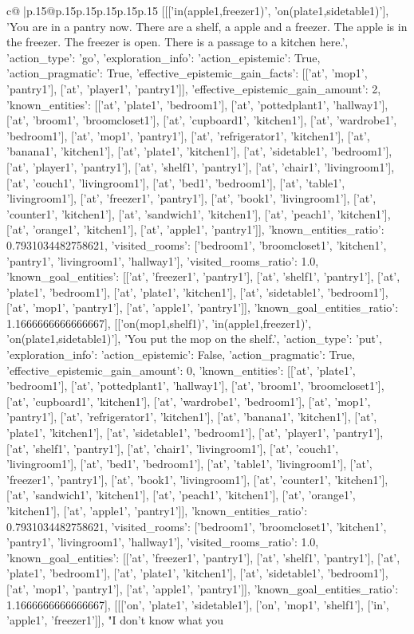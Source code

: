 \documentclass{article}
\begin{document}
{\begin{supertabular}{c@{$\;$}|p{.15\linewidth}@{}p{.15\linewidth}p{.15\linewidth}p{.15\linewidth}p{.15\linewidth}p{.15\linewidth}}
{{{	 [[['in(apple1,freezer1)', 'on(plate1,sidetable1)'], 'You are in a pantry now. There are a shelf, a apple and a freezer. The apple is in the freezer. The freezer is open. There is a passage to a kitchen here.', {'action_type': 'go', 'exploration_info': {'action_epistemic': True, 'action_pragmatic': True, 'effective_epistemic_gain_facts': [['at', 'mop1', 'pantry1'], ['at', 'player1', 'pantry1']], 'effective_epistemic_gain_amount': 2, 'known_entities': [['at', 'plate1', 'bedroom1'], ['at', 'pottedplant1', 'hallway1'], ['at', 'broom1', 'broomcloset1'], ['at', 'cupboard1', 'kitchen1'], ['at', 'wardrobe1', 'bedroom1'], ['at', 'mop1', 'pantry1'], ['at', 'refrigerator1', 'kitchen1'], ['at', 'banana1', 'kitchen1'], ['at', 'plate1', 'kitchen1'], ['at', 'sidetable1', 'bedroom1'], ['at', 'player1', 'pantry1'], ['at', 'shelf1', 'pantry1'], ['at', 'chair1', 'livingroom1'], ['at', 'couch1', 'livingroom1'], ['at', 'bed1', 'bedroom1'], ['at', 'table1', 'livingroom1'], ['at', 'freezer1', 'pantry1'], ['at', 'book1', 'livingroom1'], ['at', 'counter1', 'kitchen1'], ['at', 'sandwich1', 'kitchen1'], ['at', 'peach1', 'kitchen1'], ['at', 'orange1', 'kitchen1'], ['at', 'apple1', 'pantry1']], 'known_entities_ratio': 0.7931034482758621, 'visited_rooms': ['bedroom1', 'broomcloset1', 'kitchen1', 'pantry1', 'livingroom1', 'hallway1'], 'visited_rooms_ratio': 1.0, 'known_goal_entities': [['at', 'freezer1', 'pantry1'], ['at', 'shelf1', 'pantry1'], ['at', 'plate1', 'bedroom1'], ['at', 'plate1', 'kitchen1'], ['at', 'sidetable1', 'bedroom1'], ['at', 'mop1', 'pantry1'], ['at', 'apple1', 'pantry1']], 'known_goal_entities_ratio': 1.1666666666666667}}], [['on(mop1,shelf1)', 'in(apple1,freezer1)', 'on(plate1,sidetable1)'], 'You put the mop on the shelf.', {'action_type': 'put', 'exploration_info': {'action_epistemic': False, 'action_pragmatic': True, 'effective_epistemic_gain_amount': 0, 'known_entities': [['at', 'plate1', 'bedroom1'], ['at', 'pottedplant1', 'hallway1'], ['at', 'broom1', 'broomcloset1'], ['at', 'cupboard1', 'kitchen1'], ['at', 'wardrobe1', 'bedroom1'], ['at', 'mop1', 'pantry1'], ['at', 'refrigerator1', 'kitchen1'], ['at', 'banana1', 'kitchen1'], ['at', 'plate1', 'kitchen1'], ['at', 'sidetable1', 'bedroom1'], ['at', 'player1', 'pantry1'], ['at', 'shelf1', 'pantry1'], ['at', 'chair1', 'livingroom1'], ['at', 'couch1', 'livingroom1'], ['at', 'bed1', 'bedroom1'], ['at', 'table1', 'livingroom1'], ['at', 'freezer1', 'pantry1'], ['at', 'book1', 'livingroom1'], ['at', 'counter1', 'kitchen1'], ['at', 'sandwich1', 'kitchen1'], ['at', 'peach1', 'kitchen1'], ['at', 'orange1', 'kitchen1'], ['at', 'apple1', 'pantry1']], 'known_entities_ratio': 0.7931034482758621, 'visited_rooms': ['bedroom1', 'broomcloset1', 'kitchen1', 'pantry1', 'livingroom1', 'hallway1'], 'visited_rooms_ratio': 1.0, 'known_goal_entities': [['at', 'freezer1', 'pantry1'], ['at', 'shelf1', 'pantry1'], ['at', 'plate1', 'bedroom1'], ['at', 'plate1', 'kitchen1'], ['at', 'sidetable1', 'bedroom1'], ['at', 'mop1', 'pantry1'], ['at', 'apple1', 'pantry1']], 'known_goal_entities_ratio': 1.1666666666666667}}], [[['on', 'plate1', 'sidetable1'], ['on', 'mop1', 'shelf1'], ['in', 'apple1', 'freezer1']], "I don't know what you }}}
\end{supertabular}}
\end{document}
